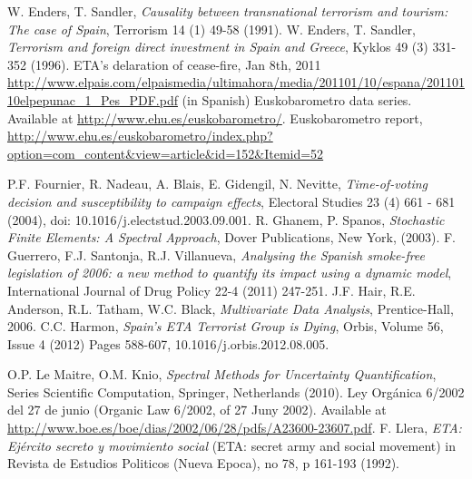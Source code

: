 \documentclass[12pt,a4paper]{report}
\begin{document}
\begin{thebibliography}{99}
 W. Enders, T. Sandler, \textit{Causality between transnational terrorism and tourism: The case of Spain}, Terrorism 14 (1) 49-58 (1991).
 W. Enders, T. Sandler, \textit{Terrorism and foreign direct investment in Spain and Greece}, Kyklos 49 (3) 331-352 (1996).
 ETA's delaration of cease-fire, Jan 8th, 2011 \url{http://www.elpais.com/elpaismedia/ultimahora/media/201101/10/espana/20110110elpepunac_1_Pes_PDF.pdf} (in Spanish)
 Euskobarometro data series. Available at \url{http://www.ehu.es/euskobarometro/}.
 Euskobarometro report, \url{http://www.ehu.es/euskobarometro/index.php?option=com_content&view=article&id=152&Itemid=52}

 P.F. Fournier, R. Nadeau, A. Blais, E. Gidengil, N. Nevitte, \textit{Time-of-voting decision and susceptibility to campaign effects}, Electoral Studies 23 (4) 661 - 681 (2004), doi: 10.1016/j.electstud.2003.09.001.
 R. Ghanem, P. Spanos, \textit{Stochastic Finite Elements: A Spectral Approach}, Dover Publications, New York, (2003).
 F. Guerrero, F.J. Santonja, R.J. Villanueva, \textit{Analysing the Spanish smoke-free legislation of 2006: a new method to quantify its impact using a dynamic model}, International Journal of Drug Policy 22-4 (2011) 247-251.
 J.F. Hair, R.E. Anderson, R.L. Tatham, W.C. Black, \textit{Multivariate Data Analysis}, Prentice-Hall, 2006.
 C.C. Harmon, \textit{Spain's ETA Terrorist Group is Dying}, Orbis, Volume 56, Issue 4 (2012) Pages 588-607, 10.1016/j.orbis.2012.08.005.

 O.P. Le Maitre, O.M. Knio, \textit{Spectral Methods for Uncertainty Quantification}, Series Scientific Computation,  Springer, Netherlands (2010).
 Ley Org\' anica 6/2002 del 27 de junio (Organic Law 6/2002, of 27 Juny 2002). Available at \url{http://www.boe.es/boe/dias/2002/06/28/pdfs/A23600-23607.pdf}.
 F. Llera, \textit{ETA: Ej\'ercito secreto y movimiento social} (ETA: secret army and social movement) in Revista de Estudios Politicos (Nueva Epoca), no 78, p 161-193 (1992).


\end{thebibliography}
\end{document}
